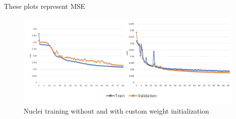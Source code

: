 These plots represent MSE
\begin{figure}[H]
	\begin{center}
		\includegraphics[width=0.8\linewidth]{bilder/nuclei/wi-no-wi.png}
		\caption{Nuclei training without and with custom weight initialization}\label{fig:wi}
	\end{center}
\end{figure}
